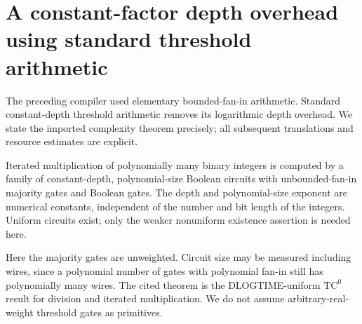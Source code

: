 \section{A constant-factor depth overhead using standard threshold arithmetic}
\label{sec:constant-depth-compiler}
The preceding compiler used elementary bounded-fan-in arithmetic. Standard constant-depth threshold arithmetic removes its logarithmic depth overhead. We state the imported complexity theorem precisely; all subsequent translations and resource estimates are explicit.

\begin{theorem}
\label{thm:tc0-arithmetic-import}
Iterated multiplication of polynomially many binary integers is computed by a family of constant-depth, polynomial-size Boolean circuits with unbounded-fan-in majority gates and Boolean gates. The depth and polynomial-size exponent are numerical constants, independent of the number and bit length of the integers. Uniform circuits exist; only the weaker nonuniform existence assertion is needed here.
\end{theorem}

Here the majority gates are unweighted. Circuit size may be measured including wires, since a polynomial number of gates with polynomial fan-in still has polynomially many wires. The cited theorem is the DLOGTIME-uniform $\mathrm{TC}^0$ result for division and iterated multiplication. We do not assume arbitrary-real-weight threshold gates as primitives.

